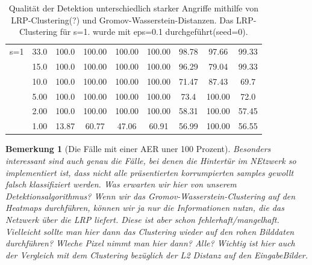 \documentclass[11pt,a4paper]{article}
\newtheorem{remark}[theorem]{Bemerkung}
\numberwithin{equation}{section}
\begin{document}
\begin{table}[ht]
\begin{center}
{\begin{tabular}{|l|c|c|ccc|ccc|}
				s=1 			& 33.0 			& 100.0 	& 100.00& 100.00	& 100.00& 98.78	& 97.66	& 99.33	 \\ 
								& 15.0			& 100.0		& 100.00& 100.00	& 100.00& 96.29	& 79.04	& 99.33	 \\
								& 10.0			& 100.0		& 100.00& 100.00	& 100.00& 71.47	& 87.43 & 69.7 	 \\
								& 5.00			& 100.0		& 100.00& 100.00	& 100.00& 73.4	& 100.00& 72.0	\\
								& 2.00			& 100.0		& 100.00& 100.00	& 100.00& 58.31 & 100.00& 57.45		\\
								& 1.00			& 13.87		& 60.77 & 47.06		& 60.91	& 56.99	& 100.00& 56.55 \\ \hline
			\end{tabular}}
			\caption[Vergleich von Angriffen und Verteidigungen für SPA]{Qualität der Detektion unterschiedlich starker Angriffe mithilfe von LRP-Clustering(?) und Gromov-Wasserstein-Distanzen. Das LRP-Clustering für s=1. wurde mit eps=0.1 durchgeführt(seed=0).}
			\label{tab:SPA_def_inv3_gwclustering}	
		\end{center}
	\end{table}
	\begin{remark}[Die Fälle mit einer AER uner 100 Prozent]
		Besonders interessant sind auch genau die Fälle, bei denen die Hintertür im NEtzwerk so implementiert ist, dass nicht alle präsentierten korrumpierten samples gewollt falsch klassifiziert werden. Was erwarten wir hier von unserem Detektionsalgorithmus? Wenn wir das Gromov-Wasserstein-Clustering auf den Heatmaps durchführen, können wir ja nur die Informationen nutzn, die das Netzwerk über die LRP liefert. Diese ist aber schon fehlerhaft/mangelhaft. Vielleicht sollte man hier dann das Clustering wieder auf den rohen Bilddaten durchführen?  Wleche Pixel nimmt man hier dann? Alle? Wichtig ist hier auch der Vergleich mit dem Clustering bezüglich der L2 Distanz auf den EingabeBilder.
	\end{remark}
	
\end{document}
